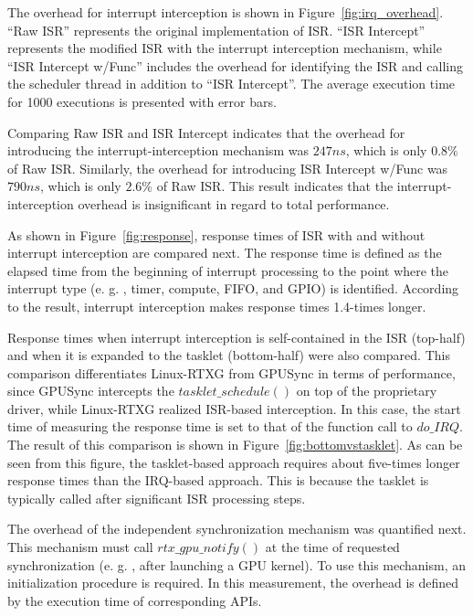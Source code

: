 The overhead for interrupt interception is shown in Figure~\ref{fig:irq_overhead}. ``Raw ISR'' represents the original implementation of ISR.
``ISR Intercept'' represents the modified ISR with the interrupt interception mechanism, while ``ISR Intercept w/Func'' includes the overhead for identifying the ISR and calling the scheduler thread in addition to ``ISR Intercept''.
The average execution time for 1000 executions is presented with error bars.


Comparing Raw ISR and ISR Intercept indicates that the overhead for introducing the interrupt-interception mechanism was $247ns$, which is only $0.
8\%$ of Raw ISR.
 Similarly, the overhead for introducing ISR Intercept w/Func was $790ns$, which is only $2.
6\%$ of Raw ISR.
 This result indicates that the interrupt-interception overhead is insignificant in regard to total performance.


As shown in Figure~\ref{fig:response}, response times of ISR with and without interrupt interception are compared next.
The response time is defined as the elapsed time from the beginning of interrupt processing to the point where the interrupt type (e.
g.
, timer, compute, FIFO, and GPIO) is identified.
According to the result, interrupt interception makes response times 1.4-times longer.

Response times when interrupt interception is self-contained in the ISR (top-half) and when it is expanded to the tasklet (bottom-half) were also compared.
This comparison differentiates Linux-RTXG from GPUSync in terms of performance, since GPUSync intercepts the $tasklet\_schedule()$ on top of the proprietary driver, while Linux-RTXG realized ISR-based interception.
In this case, the start time of measuring the response time is set to that of the function call to $do\_IRQ$.
The result of this comparison is shown in Figure~\ref{fig:bottomvstasklet}.
As can be seen from this figure, the tasklet-based approach requires about five-times longer response times than the IRQ-based approach.
This is because the tasklet is typically called after significant ISR processing steps.


The overhead of the independent synchronization mechanism was quantified next.
This mechanism must call $rtx\_gpu\_notify()$ at the time of requested synchronization (e.
g.
, after launching a GPU kernel).
To use this mechanism, an initialization procedure is required.
In this measurement, the overhead is defined by the execution time of corresponding APIs.


